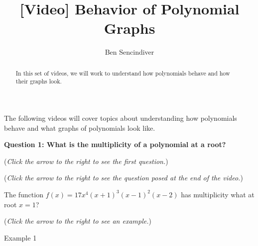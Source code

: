 \documentclass{ximera}
\title[Prerequisite Videos: ]{[Video] Behavior of Polynomial Graphs}
\author{Ben Sencindiver}
\begin{document}
\begin{abstract}
   In this set of videos, we will work to understand how 
   polynomials behave and how their graphs look.  
\end{abstract}
\maketitle

The following videos will cover topics about understanding how polynomials behave and what graphs of polynomials look like.

\textbf{Question 1: What is the multiplicity of a polynomial at a root?}
\begin{question}
\begin{flushright}
{\color{blue}(\emph{Click the arrow to the right to see the first question.})}
\end{flushright}
\begin{center}
\begin{expandable}
\begin{flushright}
{\color{blue}(\emph{Click the arrow to the right to see the question
posed at the end of the video.})}
\end{flushright}
\begin{expandable}
The function $f(x) = 17x^4(x+1)^3(x-1)^2(x-2)$ has multiplicity what at root $x=1$?
\begin{multipleChoice}
\end{multipleChoice}
\begin{flushright}
{\color{blue}(\emph{Click the arrow to the right to see an example.})}
\end{flushright}
\begin{expandable}
Example 1
\end{expandable}
\end{expandable}
\end{expandable}
\end{center}
\end{question}
\end{document}
